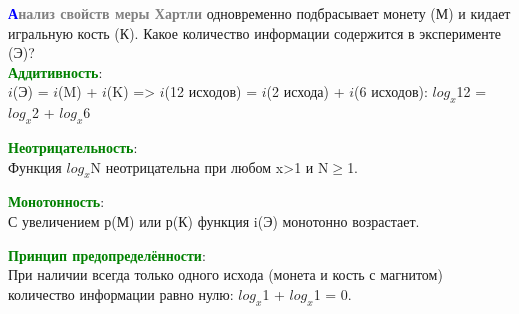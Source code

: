 \begin{frame}{\hspace{6.5cm}\textbf{\textcolor{blue}{А}\textcolor{gray}{нализ свойств меры Хартли}}}
    \fontsize{10pt}{13pt}\selectfont
    \setlength{\parindent}{3ex}
     одновременно подбрасывает монету (М) и кидает игральную кость (К). Какое количество информации содержится в эксперименте (Э)?\\
    \vspace*{2mm}
    \noindent\textbf{\textcolor{Green}{Аддитивность}}:\\
    $i$(Э) = $i$(M) + $i$(K) => $i$(12 исходов) = $i$(2 исхода) + $i$(6 исходов): $log_x$12 = $log_x$2 + $log_x$6

    \noindent\textbf{\textcolor{Green}{Неотрицательность}}: \\
    Функция $log_x$N неотрицательна при любом x>1 и N$\geqslant$1.
 
    \noindent\textbf{\textcolor{Green}{Монотонность}}:\\
    С увеличением р(М) или р(К) функция i(Э) монотонно возрастает.

    \noindent\textbf{\textcolor{Green}{Принцип предопределённости}}:\\
    При наличии всегда только одного исхода (монета и кость с магнитом) количество информации равно нулю: $log_x$1 + $log_x$1 = 0.
    
\end{frame}